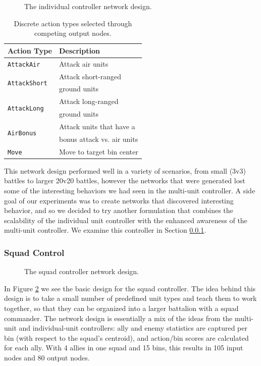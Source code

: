 \documentclass[10pt,a4paper,twocolumn]{article}
\begin{document}
\begin{figure}

\caption{The individual controller network design.}
\label{fig:design_individual}
\end{figure}

\begin{table}
\centering
\begin{tabular}{|l|l|}
	\hline
	{\bf Action Type} & {\bf Description}\\ \hline
	\texttt{AttackAir} & Attack air units\\ \hline
	\multirow{2}{*}{\texttt{AttackShort}} & Attack short-ranged \\
	& ground units\\ \hline
	\multirow{2}{*}{\texttt{AttackLong}} & Attack long-ranged \\ 
	& ground units\\ \hline
	\multirow{2}{*}{\texttt{AirBonus}} & Attack units that have a \\
	& bonus attack vs. air units\\ \hline
	\texttt{Move} & Move to target bin center\\ \hline
\end{tabular}
\caption{Discrete action types selected through competing output nodes.}
\label{tab:actions}
\end{table}

This network design performed well in a variety of scenarios, from small (3v3) battles to larger 20v20 battles, however the networks that were generated lost some of the interesting behaviors we had seen in the multi-unit controller. A side goal of our experiments was to create networks that discovered interesting behavior, and so we decided to try another formulation that combines the scalability of the individual unit controller with the enhanced awareness of the multi-unit controller. We examine this controller in Section \ref{sec:squad_design}.

\subsubsection{Squad Control}
\label{sec:squad_design}

\begin{figure}

\caption{The squad controller network design.}
\label{fig:squad_design}
\end{figure}

In Figure \ref{fig:squad_design} we see the basic design for the squad controller. The idea behind this design is to take a small number of predefined unit types and teach them to work together, so that they can be organized into a larger battalion with a squad commander. The network design is essentially a mix of the ideas from the multi-unit and individual-unit controllers: ally and enemy statistics are captured per bin (with respect to the squad's centroid), and action/bin scores are calculated for each ally. With 4 allies in one squad and 15 bins, this results in 105 input nodes and 80 output nodes.
\end{document}
